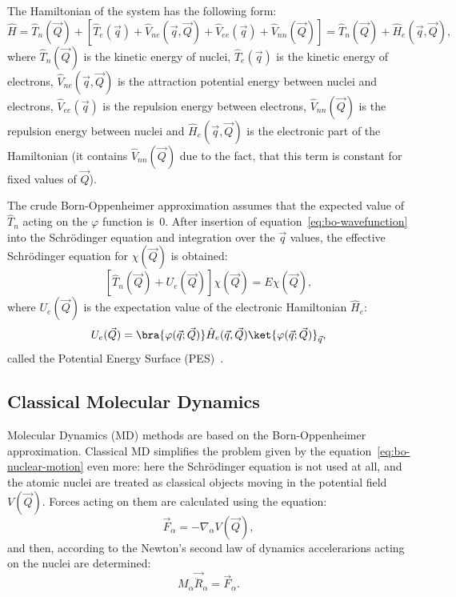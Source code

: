 The Hamiltonian of the system has the following form:
\begin{equation}
    \hat{H} = \hat{T}_n(\vec{Q}) + \left[ \hat{T}_e(\vec{q}) + \hat{V}_{ne}(\vec{q}, \vec{Q}) + \hat{V}_{ee}(\vec{q}) + \hat{V}_{nn}(\vec{Q}) \right] = \hat{T}_n(\vec{Q}) + \hat{H}_e(\vec{q}, \vec{Q}),
    \label{eq:hamiltonian}
\end{equation}
where $\hat{T}_n(\vec{Q})$ is the kinetic energy of nuclei, $\hat{T}_e(\vec{q})$ is the kinetic energy of electrons, $\hat{V}_{ne}(\vec{q}, \vec{Q})$ is the attraction potential energy between nuclei and electrons, $\hat{V}_{ee}(\vec{q})$ is the repulsion energy between electrons, $\hat{V}_{nn}(\vec{Q})$ is the repulsion energy between nuclei and $\hat{H}_e(\vec{q}, \vec{Q})$ is the electronic part of the Hamiltonian (it contains $\hat{V}_{nn}(\vec{Q})$ due to the fact, that this term is constant for fixed values of $\vec{Q}$).

The crude Born-Oppenheimer approximation assumes that the expected value of $\hat{T}_n$ acting on the $\varphi$ function is~0. After insertion of equation~\ref{eq:bo-wavefunction} into the Schr\"{o}dinger equation and integration over the $\vec{q}$ values, the effective Schr\"{o}dinger equation for $\chi(\vec{Q})$ is obtained:
\begin{equation}
    \left[ \hat{T}_n(\vec{Q}) + U_e (\vec{Q}) \right] \chi(\vec{Q}) = E \chi(\vec{Q}),
    \label{eq:bo-nuclear-motion}
\end{equation}
where $U_e(\vec{Q})$ is the expectation value of the electronic Hamiltonian $\hat{H}_e$:
\begin{equation}
    U_e (\vec{Q}) = \bra{\varphi(\vec{q}; \vec{Q})}\hat{H}_e(\vec{q}, \vec{Q}) \ket{\varphi(\vec{q}; \vec{Q})}_{\vec{q}},
    \label{eq:pes}
\end{equation}
called the Potential Energy Surface (PES)~\cite{nalewajski-perspectives}.

\subsection{Classical Molecular Dynamics}

Molecular Dynamics (MD) methods are based on the Born-Oppenheimer approximation. Classical MD simplifies the problem given by the equation~\ref{eq:bo-nuclear-motion} even more: here the Schr\"{o}dinger equation is not used at all, and the atomic nuclei are treated as classical objects moving in the potential field $V(\vec{Q})$. Forces acting on them are calculated using the equation:
\begin{equation}
    \vec{F}_{\alpha} = -\nabla_{\alpha} V(\vec{Q}),
\end{equation}
and then, according to the Newton's second law of dynamics accelerarions acting on the nuclei are determined:
\begin{equation}
    M_{\alpha} \vec{\ddot{R}}_{\alpha} = \vec{F}_{\alpha}.
\end{equation}

